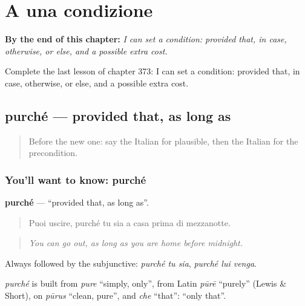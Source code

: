 
\chapter{A una condizione}
\label{ch:it-a-una-condizione}

\begin{chapteropening}
\textbf{By the end of this chapter:} \emph{I can set a condition: provided that, in case, otherwise, or else, and a possible extra cost.}

Complete the last lesson of chapter 373: I can set a condition: provided that, in case, otherwise, or else, and a possible extra cost.
\end{chapteropening}

\section[purché]{purché — provided that, as long as}

\label{lesson:IT-C373-purche}



\begin{quote}
Before the new one: say the Italian for plausible, then the Italian for the precondition.
\end{quote}

\subsection*{You'll want to know: purché}
\textbf{purché} — \textquotedblleft{}provided that, as long as\textquotedblright{}.

\begin{quote}
Puoi uscire, purché tu sia a casa prima di mezzanotte.
\end{quote}

\begin{quote}
\emph{You can go out, as long as you are home before midnight.}
\end{quote}

Always followed by the subjunctive: \emph{purché tu sia}, \emph{purché lui venga}.

\begin{cousinweb}
\emph{purché} is built from \emph{pure} \textquotedblleft{}simply, only\textquotedblright{}, from Latin \emph{pūrē} \textquotedblleft{}purely\textquotedblright{} (Lewis \& Short), on \emph{pūrus} \textquotedblleft{}clean, pure\textquotedblright{}, and \emph{che} \textquotedblleft{}that\textquotedblright{}: \textquotedblleft{}only that\textquotedblright{}.
\end{cousinweb}

